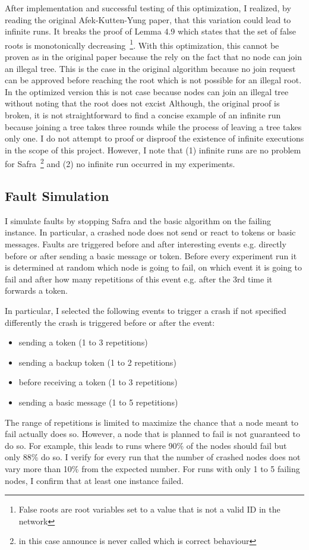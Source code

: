 After implementation and successful testing of this optimization, I realized, by reading the original Afek-Kutten-Yung paper, that this variation could lead to infinite runs. %
It breaks the proof of Lemma 4.9 which states that the set of false roots is monotonically decreasing~\footnote{False roots are root variables set to a value that is not a valid ID in the network}.
With this optimization, this cannot be proven as in the original paper because the rely on the fact that no node can join an illegal tree.
This is the case in the original algorithm because no join request can be approved before reaching the root which is not possible for an illegal root.
In the optimized version this is not case because nodes can join an illegal tree without noting that the root does not excist
Although, the original proof is broken, it is not straightforward to find a concise example of an infinite run because joining a tree takes three rounds while the process of leaving a tree takes only one.
I do not attempt to proof or disproof the existence of infinite executions in the scope of this project.
However, I note that (1) infinite runs are no problem for Safra~\footnote{in this case announce is never called which is correct behaviour} and (2) no infinite run occurred in my experiments.

\subsection{Fault Simulation}
I simulate faults by stopping Safra and the basic algorithm on the failing instance.
In particular, a crashed node does not send or react to tokens or basic messages.
Faults are triggered before and after interesting events e.g. directly before or after sending a basic message or token. 
Before every experiment run it is determined at random which node is going to fail, on which event it is going to fail and after how many repetitions of this event e.g. after the 3rd time it forwards a token.

In particular, I selected the following events to trigger a crash if not specified differently the crash is triggered before or after the event:
\begin{itemize}
	\item sending a token (1 to 3 repetitions)
	\item sending a backup token (1 to 2 repetitions)
	\item before receiving a token (1 to 3 repetitions)
	\item sending a basic message (1 to 5 repetitions)
\end{itemize}
The range of repetitions is limited to maximize the chance that a node meant to fail actually does so. 
However, a node that is planned to fail is not guaranteed to do so.
For example, this leads to runs where 90\% of the nodes should fail but only 88\% do so.
I verify for every run that the number of crashed nodes does not vary more than 10\% from the expected number. For runs with only 1 to 5 failing nodes, I confirm that at least one instance failed.

